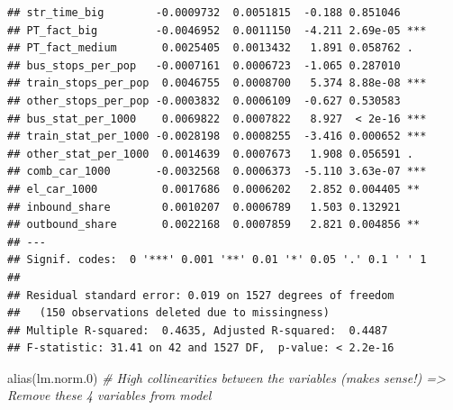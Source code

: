 \documentclass[
]{article}
\newenvironment{Shaded}{\begin{snugshade}}{\end{snugshade}}
\newcommand{\CommentTok}[1]{\textcolor[rgb]{0.56,0.35,0.01}{\textit{#1}}}
\newcommand{\FloatTok}[1]{\textcolor[rgb]{0.00,0.00,0.81}{#1}}
\newcommand{\FunctionTok}[1]{\textcolor[rgb]{0.00,0.00,0.00}{#1}}
\newcommand{\NormalTok}[1]{#1}
\begin{document}
\begin{verbatim}
## str_time_big        -0.0009732  0.0051815  -0.188 0.851046    
## PT_fact_big         -0.0046952  0.0011150  -4.211 2.69e-05 ***
## PT_fact_medium       0.0025405  0.0013432   1.891 0.058762 .  
## bus_stops_per_pop   -0.0007161  0.0006723  -1.065 0.287010    
## train_stops_per_pop  0.0046755  0.0008700   5.374 8.88e-08 ***
## other_stops_per_pop -0.0003832  0.0006109  -0.627 0.530583    
## bus_stat_per_1000    0.0069822  0.0007822   8.927  < 2e-16 ***
## train_stat_per_1000 -0.0028198  0.0008255  -3.416 0.000652 ***
## other_stat_per_1000  0.0014639  0.0007673   1.908 0.056591 .  
## comb_car_1000       -0.0032568  0.0006373  -5.110 3.63e-07 ***
## el_car_1000          0.0017686  0.0006202   2.852 0.004405 ** 
## inbound_share        0.0010207  0.0006789   1.503 0.132921    
## outbound_share       0.0022168  0.0007859   2.821 0.004856 ** 
## ---
## Signif. codes:  0 '***' 0.001 '**' 0.01 '*' 0.05 '.' 0.1 ' ' 1
## 
## Residual standard error: 0.019 on 1527 degrees of freedom
##   (150 observations deleted due to missingness)
## Multiple R-squared:  0.4635, Adjusted R-squared:  0.4487 
## F-statistic: 31.41 on 42 and 1527 DF,  p-value: < 2.2e-16
\end{verbatim}

\begin{Shaded}
\begin{Highlighting}[]
\FunctionTok{alias}\NormalTok{(lm.norm}\FloatTok{.0}\NormalTok{) }\CommentTok{\# High collinearities between the variables (makes sense!) =\textgreater{} Remove these 4 variables from model}
\end{Highlighting}
\end{Shaded}
\end{document}
